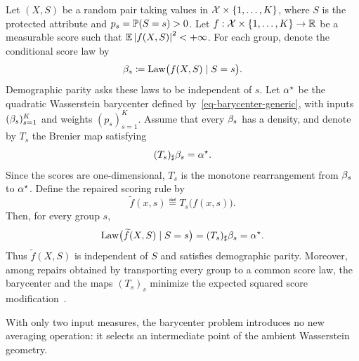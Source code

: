 \begin{example}\label{ex-fair-score-repair}
	Let $(X,S)$ be a random pair taking values in $\mathcal{X}\times\{1,\ldots,K\}$, where $S$ is the protected attribute and $p_s=\mathbb{P}(S=s)>0$. Let $f:\mathcal{X}\times\{1,\ldots,K\}\to\mathbb{R}$ be a measurable score such that $\mathbb{E}\left\lvert f(X,S)\right\rvert^2<+\infty$. For each group, denote the conditional score law by
	\[
		\beta_s
		\coloneqq
		\operatorname{Law}\bigl(f(X,S)\mid S=s\bigr).
	\]
	Demographic parity asks these laws to be independent of $s$. Let $\alpha^\star$ be the quadratic Wasserstein barycenter defined by~\eqref{eq-barycenter-generic}, with inputs $(\beta_s)_{s=1}^K$ and weights $(p_s)_{s=1}^K$. Assume that every $\beta_s$ has a density, and denote by $T_s$ the Brenier map satisfying
	\[
		(T_s)_\sharp\beta_s=\alpha^\star.
	\]
	Since the scores are one-dimensional, $T_s$ is the monotone rearrangement from $\beta_s$ to $\alpha^\star$. Define the repaired scoring rule by
	\[
		\widetilde f(x,s)
		\eqdef
		T_s\bigl(f(x,s)\bigr).
	\]
	Then, for every group $s$,
	\[
		\operatorname{Law}\bigl(\widetilde f(X,S)\mid S=s\bigr)
		=
		(T_s)_\sharp\beta_s
		=
		\alpha^\star.
	\]
	Thus $\widetilde f(X,S)$ is independent of $S$ and satisfies demographic parity. Moreover, among repairs obtained by transporting every group to a common score law, the barycenter and the maps $(T_s)_s$ minimize the expected squared score modification~\cite{DelBarrioGamboaGordalizaLoubes2018FairOT,ChzhenDenisHebiriOnetoPontil2020FairBarycenters,BuylDeBie2022FairClassifiers,HuRatzCharpentier2023FairBarycenters}.
\end{example}

With only two input measures, the barycenter problem introduces no new averaging operation: it selects an intermediate point of the ambient Wasserstein geometry.

